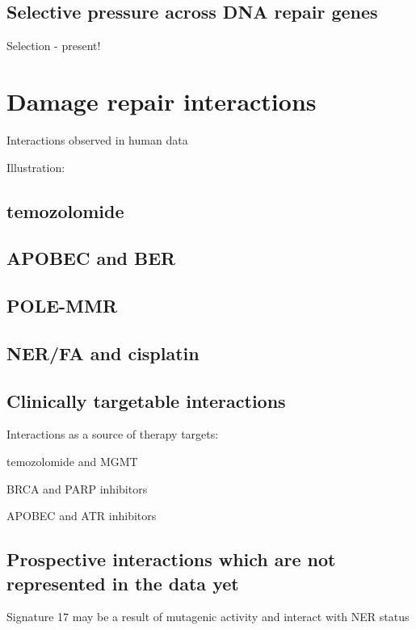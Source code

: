 \subsection{Selective pressure across DNA repair genes}

Selection - present!


\section{Damage repair interactions}

Interactions observed in human data

Illustration:

\subsection*{temozolomide}

\subsection*{APOBEC and BER}

\subsection*{POLE-MMR}

\subsection*{NER/FA and cisplatin}

\subsection{Clinically targetable interactions}

Interactions as a source of therapy targets:

temozolomide and MGMT

BRCA and PARP inhibitors

APOBEC and ATR inhibitors

\subsection*{Prospective interactions which are not represented in the data yet}

Signature 17 may be a result of mutagenic activity and interact with NER status


